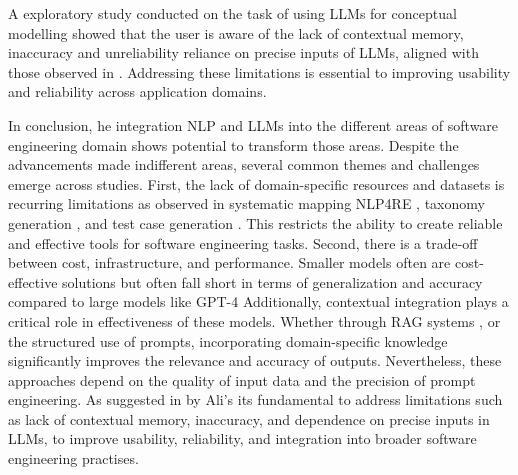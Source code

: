 A exploratory study conducted on the task of using LLMs \cite{21Ali} for conceptual modelling showed that the user is aware of the lack of contextual memory, inaccuracy and unreliability reliance on precise inputs of LLMs, aligned with those observed in \cite{18Chen}. Addressing these limitations is essential to improving usability and reliability across application domains.

In conclusion, he integration NLP and LLMs into the different areas of software engineering domain shows potential to transform those areas. Despite the advancements made indifferent areas, several common themes and challenges emerge across studies. 
First, the lack of domain-specific resources and datasets is recurring limitations as observed in systematic mapping NLP4RE \cite{22Zhao}, taxonomy generation \cite{18Chen}, and test case generation \cite{20Arora}. This restricts the ability to create reliable and effective tools for software engineering tasks. Second, there is a trade-off between cost, infrastructure, and performance. Smaller models often are cost-effective solutions but often fall short in terms of generalization and accuracy compared to large models like GPT-4
Additionally, contextual integration plays a critical role in effectiveness of these models. Whether through RAG systems \cite{20Arora,17Dhar}, or the structured use of prompts, incorporating domain-specific knowledge significantly improves the relevance and accuracy of outputs. Nevertheless, these approaches depend on the quality of input data and the precision of prompt engineering.
As suggested in by Ali's \cite{21Ali} its fundamental to address limitations such as lack of contextual memory, inaccuracy, and dependence on precise inputs in LLMs, to improve usability, reliability, and integration into broader software engineering practises.


